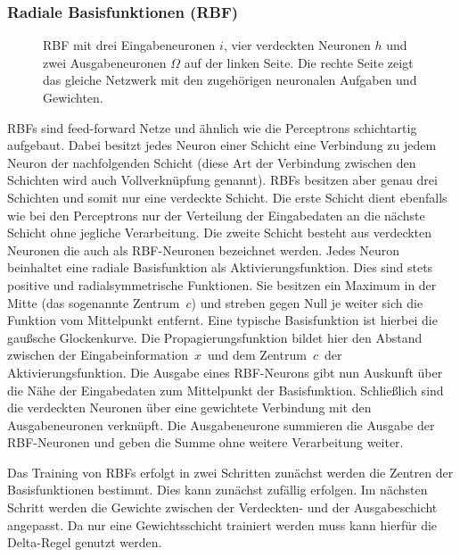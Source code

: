 \subsubsection{Radiale Basisfunktionen (RBF)}
\begin{figure}[!htb]
    \centering
        
    \caption{RBF mit drei Eingabeneuronen $i$, vier verdeckten Neuronen $h$  und zwei Ausgabeneuronen $\Omega$ auf der linken Seite. Die rechte Seite zeigt das gleiche Netzwerk mit den zugehörigen neuronalen Aufgaben und Gewichten.}
    \label{fig:RBF}
\end{figure}

RBFs sind feed-forward Netze und ähnlich wie die Perceptrons schichtartig aufgebaut. Dabei besitzt jedes Neuron einer Schicht eine Verbindung zu jedem Neuron der nachfolgenden Schicht (diese Art der Verbindung zwischen den Schichten wird auch Vollverknüpfung genannt). RBFs besitzen aber genau drei Schichten und somit nur eine verdeckte Schicht. Die erste Schicht dient ebenfalls wie bei den Perceptrons nur der Verteilung der Eingabedaten an die nächste Schicht ohne jegliche Verarbeitung. Die zweite Schicht besteht aus verdeckten Neuronen die auch als RBF-Neuronen  bezeichnet werden. Jedes Neuron beinhaltet eine radiale Basisfunktion als Aktivierungsfunktion. Dies sind stets positive und radialsymmetrische Funktionen. Sie besitzen ein Maximum in der Mitte (das sogenannte Zentrum~$c$) und streben gegen Null je weiter sich die Funktion vom Mittelpunkt entfernt. Eine typische Basisfunktion ist hierbei die gaußsche Glockenkurve. Die Propagierungsfunktion bildet hier den Abstand zwischen der Eingabeinformation~$x$~und dem Zentrum~$c$~der Aktivierungsfunktion. Die Ausgabe eines RBF-Neurons gibt nun Auskunft über die Nähe der Eingabedaten zum Mittelpunkt der Basisfunktion. Schließlich sind die verdeckten Neuronen über eine gewichtete Verbindung mit den Ausgabeneuronen  verknüpft. Die Ausgabeneurone summieren die Ausgabe der RBF-Neuronen und geben die Summe ohne weitere Verarbeitung weiter. 

Das Training von RBFs erfolgt in zwei Schritten zunächst werden die Zentren der Basisfunktionen bestimmt. Dies kann zunächst zufällig erfolgen. Im nächsten Schritt werden die Gewichte zwischen der Verdeckten- und der Ausgabeschicht angepasst. Da nur eine Gewichtsschicht trainiert werden muss kann hierfür die Delta-Regel genutzt werden.

